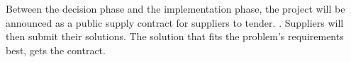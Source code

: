 Between the decision phase and the implementation phase, the project will be announced as a public supply contract for suppliers to tender. \cite{Union2004}. Suppliers will then submit their solutions. The solution that fits the problem's requirements best, gets the contract. 

